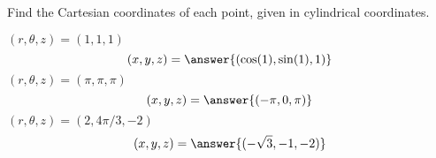 \begin{problem}
Find the Cartesian coordinates of each point, given in cylindrical coordinates.

$(r,\theta,z) = (1,1,1)$
\[
(x,y,z) = \answer{(\cos(1), \sin(1), 1)}
\]
$(r,\theta,z) = (\pi,\pi,\pi)$
\[
(x,y,z) = \answer{(-\pi, 0, \pi)}
\]
$(r,\theta,z) = (2,4\pi/3,-2)$
\[
(x,y,z) = \answer{(-\sqrt{3}, -1, -2)}
\]
\end{problem}